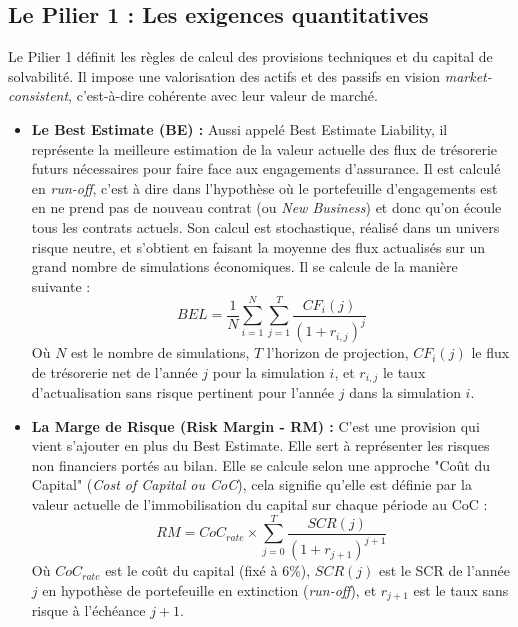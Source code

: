 \subsection{Le Pilier 1 : Les exigences quantitatives}
Le Pilier 1 définit les règles de calcul des provisions techniques et du capital de solvabilité. Il impose une valorisation des actifs et des passifs en vision \textit{market-consistent}, c'est-à-dire cohérente avec leur valeur de marché.
\begin{itemize}
    \item \textbf{Le Best Estimate (BE) :} Aussi appelé Best Estimate Liability, il représente la meilleure estimation de la valeur actuelle des flux de trésorerie futurs nécessaires pour faire face aux engagements d'assurance. Il est calculé en \textit{run-off}, c'est à dire dans l'hypothèse où le portefeuille d'engagements est en ne prend pas de nouveau contrat (ou \textit{New Business}) et donc qu'on écoule tous les contrats actuels. Son calcul est stochastique, réalisé dans un univers risque neutre, et s'obtient en faisant la moyenne des flux actualisés sur un grand nombre de simulations économiques. Il se calcule de la manière suivante :
    \begin{equation}
        BEL = \frac{1}{N}\sum_{i=1}^{N}\sum_{j=1}^{T}\frac{CF_{i}(j)}{(1+r_{i,j})^{j}}
    \end{equation}
    Où $N$ est le nombre de simulations, $T$ l'horizon de projection, $CF_{i}(j)$ le flux de trésorerie net de l'année $j$ pour la simulation $i$, et $r_{i,j}$ le taux d'actualisation sans risque pertinent pour l'année $j$ dans la simulation $i$.\newline{}

    \item \textbf{La Marge de Risque (Risk Margin - RM) :} C'est une provision qui vient s'ajouter en plus du Best Estimate. Elle sert à représenter les risques non financiers portés au bilan. Elle se calcule selon une approche "Coût du Capital" (\textit{Cost of Capital ou CoC}), cela signifie qu'elle est définie par la valeur actuelle de l'immobilisation du capital sur chaque période au CoC :
    \begin{equation}
        RM = CoC_{rate} \times \sum_{j=0}^{T} \frac{SCR(j)}{(1+r_{j+1})^{j+1}}
    \end{equation}
    Où $CoC_{rate}$ est le coût du capital (fixé à 6\%), $SCR(j)$ est le SCR de l'année $j$ en hypothèse de portefeuille en extinction (\textit{run-off}), et $r_{j+1}$ est le taux sans risque à l'échéance $j+1$.\newline{}


\end{itemize}
